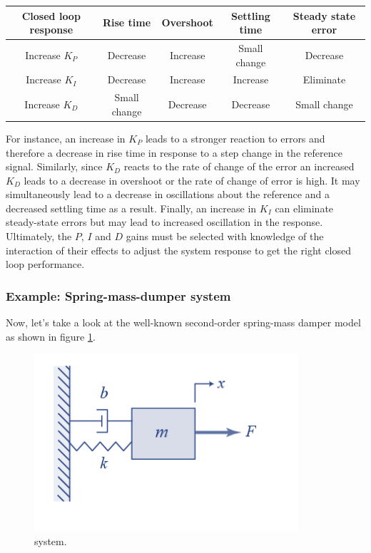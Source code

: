 \begin{center}
 \begin{tabular}{||c c c c c ||} 
 \hline
 Closed loop response & Rise time & Overshoot &  Settling time & Steady state error  \\ [0.5ex] 
 \hline\hline
 Increase $K_P$ & Decrease & Increase & Small change & Decrease  \\ 
 \hline
 Increase $K_I$  & Decrease & Increase & Increase & Eliminate \\
 \hline
 Increase $K_D$ & Small change & Decrease & Decrease & Small change  \\ [1ex] 
 \hline
\end{tabular}
\end{center}


For instance, an increase in $K_P$ leads to a stronger reaction to errors and therefore a decrease in rise time in response to a step change in the reference signal. Similarly, since $K_D$ reacts to the rate of change of the error an increased $K_D$ leads to a decrease in overshoot or the rate of change of error is high. It may simultaneously lead to a decrease in oscillations about the reference and a decreased settling time as a result. Finally, an increase in $K_I$ can eliminate steady-state errors but may lead to increased oscillation in the response. Ultimately, the $P$, $I$ and $D$ gains must be selected with knowledge of the interaction of their effects to adjust the system response to get the right closed loop performance. 

\subsubsection{Example: Spring-mass-dumper system}

Now, let's take a look at the well-known second-order spring-mass damper model as shown in figure \ref{spring_mass_damper_system}. 

\begin{figure}[!htb]
\begin{center}
\includegraphics[scale=0.380]{img/longitudinal_control/spring_mass_damper_system.jpeg}
\end{center}
\caption{ system.}
\label{spring_mass_damper_system}
\end{figure}

